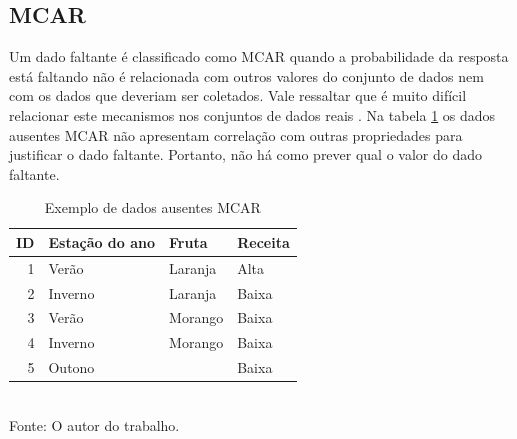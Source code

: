 \documentclass[
	12pt,				%
	openright,			%
	oneside,			%
	a4paper,			%
	english,			%
	brazil				%
	]{abntex2}
\begin{document}
		\subsection{MCAR}
			Um dado faltante é classificado como MCAR quando a probabilidade da resposta está faltando não é relacionada com outros valores do conjunto de dados nem com os dados que deveriam ser coletados.
			Vale ressaltar que é muito difícil relacionar este mecanismos nos conjuntos de dados reais \cite{molenberghs2014handbook} \cite{little2016missing}.
			Na tabela \ref{table: exemplo DA MCAR} os dados ausentes MCAR não apresentam correlação com outras propriedades para justificar o dado faltante. Portanto, não há como prever qual o valor do dado faltante.
			\begin{table}[h]
				\centering
				\caption{Exemplo de dados ausentes MCAR}
				\vspace{0.5cm}
				\label{table: exemplo DA MCAR}
				\begin{tabular}{r|lll}
				
					ID & Estação do ano & Fruta & Receita \\ %
					\hline                               %
					1 & Verão     & Laranja & Alta  \\
					2 & Inverno   & Laranja & Baixa \\
					3 & Verão     & Morango & Baixa \\
					4 & Inverno   & Morango & Baixa \\
					5 & Outono    &         & Baixa       %

				\end{tabular}
				\bigskip
				\\
				\footnotesize Fonte: O autor do trabalho.
			\end{table}
		
\end{document}
